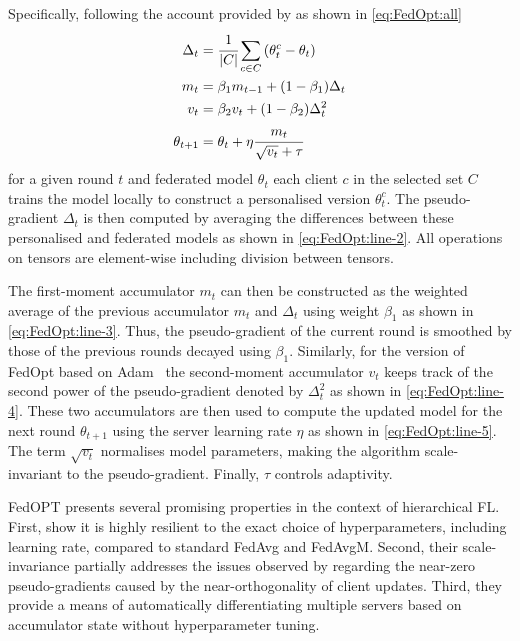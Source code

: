 Specifically, following the account provided by \citet{FedOPT} as shown in \cref{eq:FedOpt:all}
\begin{subequations}
    \begin{align}
        \Delta_t     & = \cfrac{1}{|C|} \sum_{c \in C} \left( \theta_t^c - \theta_t \right) \label{eq:FedOpt:line-2} \\
        m_t          & = \beta_1 m_{t-1} + (1-\beta_1) \Delta_t \label{eq:FedOpt:line-3}                             \\
        v_t          & = \beta_2 v_t + (1-\beta_2) \Delta_t^2 \label{eq:FedOpt:line-4}                               \\
        \theta_{t+1} & = \theta_t + \eta \cfrac{m_t}{\sqrt{v_t} + \tau} \label{eq:FedOpt:line-5}
    \end{align}
    \label{eq:FedOpt:all}
\end{subequations}
for a given round $t$ and federated model $\theta_t$  each client $c$ in the selected set $C$ trains the model locally to construct a personalised version $\theta_t^c$. The pseudo-gradient $\Delta_t$ is then computed by averaging the differences between these personalised and federated models as shown in \cref{eq:FedOpt:line-2}. All operations on tensors are element-wise including division between tensors.

The first-moment accumulator $m_t$ can then be constructed as the weighted average of the previous accumulator $m_t$ and $\Delta_t$ using weight $\beta_1$ as shown in \cref{eq:FedOpt:line-3}. Thus, the pseudo-gradient of the current round is smoothed by those of the previous rounds decayed using $\beta_1$. Similarly, for the version of FedOpt based on Adam~\citep{Adam} the second-moment accumulator $v_t$  keeps track of the second power of the pseudo-gradient denoted by $\Delta_t^2$ as shown in \cref{eq:FedOpt:line-4}. These two accumulators are then used to compute the updated model for the next round $\theta_{t+1}$ using the server learning rate $\eta$ as shown in \cref{eq:FedOpt:line-5}. The term $\sqrt{v_t}$ normalises model parameters, making the algorithm scale-invariant to the pseudo-gradient. Finally, $\tau$ controls adaptivity\@.

FedOPT presents several promising properties in the context of hierarchical FL\@. First, \citet{FedOPT} show it is highly resilient to the exact choice of hyperparameters, including learning rate, compared to standard FedAvg and FedAvgM. Second, their scale-invariance partially addresses the issues observed by \citet{LargeCohorts} regarding the near-zero pseudo-gradients caused by the near-orthogonality of client updates. Third, they provide a means of automatically differentiating multiple servers based on accumulator state without hyperparameter tuning.

